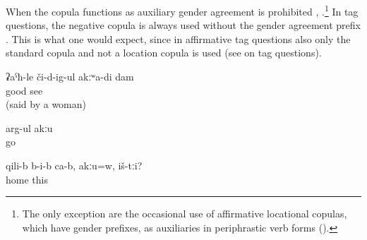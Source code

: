When the copula functions as auxiliary gender agreement is prohibited , .\footnote{The only exception are the occasional use of affirmative locational copulas, which have gender prefixes, as auxiliaries in periphrastic verb forms ().} In tag questions, the negative copula is always used without the gender agreement prefix . This is what one would expect, since in affirmative tag questions also only the standard copula and not a location copula is used (see  on tag questions).
%
\begin{exe}
	\ex	\label{ex:I do not see well}
	\gll	ʡaˁħ-le	či-d-ig-ul	akːʷa-di	dam\\
		good	see		\\
	\glt	{} (said by a woman)

	\ex	\label{ex:He is not going (with his friends)}
	\gll	arg-ul	akːu\\
		go	\\
	\glt	{}

	\ex	\label{ex:They are inside the house, aren't they}
	\gll	qili-b	b-i-b	ca-b,	akːu=w,	iš-tːi?\\
		home				this\\
	\glt	{}
\end{exe}

